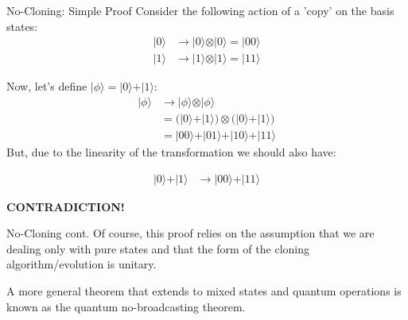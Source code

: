 \documentclass[11pt]{beamer}
\begin{document}
\begin{frame}{No-Cloning: Simple Proof}
Consider the following action of a 'copy' on the basis states:
\begin{align*}
\vert 0 \rangle & \rightarrow \vert 0 \rangle\otimes \vert 0 \rangle=\vert 00\rangle\\
\vert 1 \rangle & \rightarrow \vert 1 \rangle\otimes \vert 1 \rangle = \vert 11\rangle
\end{align*}\pause

Now, let's define $\vert \phi \rangle = \vert 0\rangle+\vert 1 \rangle$:\pause
\begin{align*}
\vert \phi \rangle & \rightarrow \vert \phi \rangle\otimes \vert \phi \rangle\\
& = \big( \vert 0\rangle+\vert 1 \rangle \big)\otimes \big( \vert 0\rangle+\vert 1 \rangle \big)\\
& = \vert 00\rangle + \vert 01\rangle +\vert 10\rangle +\vert 11\rangle
\end{align*}\pause
But, due to the linearity of the transformation we should also have:

\vspace{-.4cm}

\begin{align*}
\vert 0\rangle+\vert 1 \rangle & \rightarrow \vert 00\rangle  +\vert 11\rangle
\end{align*}
\begin{center}\small\pause
\textbf{CONTRADICTION!}
\end{center}

\end{frame}

\begin{frame}{No-Cloning cont.}
Of course, this proof relies on the assumption that we are dealing only with pure states and that the form of the cloning algorithm/evolution is unitary. \pause

\vspace{1cm}

A more general theorem that extends to mixed states and quantum operations is known as the quantum no-broadcasting theorem.
\end{frame}
\end{document}

